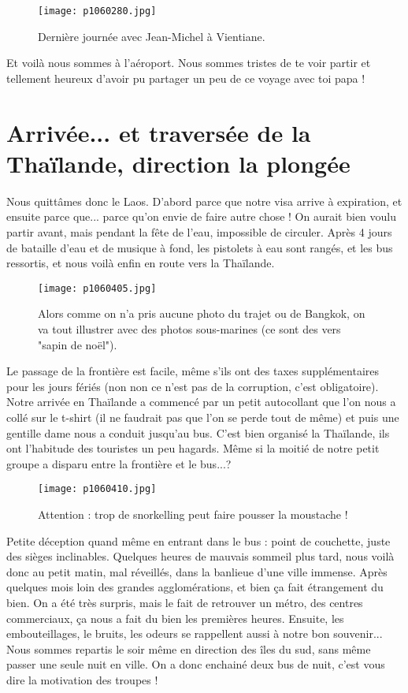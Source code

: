 \documentclass{book}
\begin{document}
\begin{figure}[h]
\centering
\texttt{[image: p1060280.jpg]}
\caption*{Dernière journée avec Jean-Michel à Vientiane.}
\end{figure}

Et voilà nous sommes à l'aéroport. Nous sommes tristes de te voir partir et tellement heureux d'avoir pu partager un peu de ce voyage avec toi papa !



\chapter{Arrivée... et traversée de la Thaïlande, direction la plongée}
Nous quittâmes donc le Laos. D'abord parce que notre visa arrive à expiration, et ensuite parce que... parce qu'on envie de faire autre chose ! On aurait bien voulu partir avant, mais pendant la fête de l'eau, impossible de circuler. Après 4 jours de bataille d'eau et de musique à fond, les pistolets à eau sont rangés, et les bus ressortis, et nous voilà enfin en route vers la Thaïlande.


\begin{figure}[h]
\centering
\texttt{[image: p1060405.jpg]}
\caption*{Alors comme on n'a pris aucune photo du trajet ou de Bangkok, on va tout illustrer avec des photos sous-marines (ce sont des vers "sapin de noël").}
\end{figure}

Le passage de la frontière est facile, même s'ils ont des taxes supplémentaires pour les jours fériés (non non ce n'est pas de la corruption, c'est obligatoire).
Notre arrivée en Thaïlande a commencé par un petit autocollant que l'on nous a collé sur le t-shirt (il ne faudrait pas que l'on se perde tout de même) et puis une gentille dame nous a conduit jusqu'au bus. C'est bien organisé la Thaïlande, ils ont l'habitude des touristes un peu hagards. Même si la moitié de notre petit groupe a disparu entre la frontière et le bus...?


\begin{figure}[h]
\centering
\texttt{[image: p1060410.jpg]}
\caption*{Attention : trop de snorkelling peut faire pousser la moustache !}
\end{figure}

Petite déception quand même en entrant dans le bus : point de couchette, juste des sièges inclinables. Quelques heures de mauvais sommeil plus tard, nous voilà donc au petit matin, mal réveillés, dans la banlieue d'une ville immense. Après quelques mois loin des grandes agglomérations, et bien ça fait étrangement du bien. On a été très surpris, mais le fait de retrouver un métro, des centres commerciaux, ça nous a fait du bien les premières heures. Ensuite, les embouteillages, le bruits, les odeurs se rappellent aussi à notre bon souvenir... Nous sommes repartis le soir même en direction des îles du sud, sans même passer une seule nuit en ville. On a donc enchainé deux bus de nuit, c'est vous dire la motivation des troupes !
\end{document}
